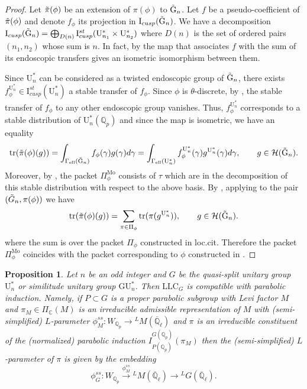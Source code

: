 \documentclass[reqno,11pt]{amsart}
\newtheorem{proposition}[theorem]{Proposition}
\theoremstyle{remark}
\newcommand{\GU}{\mathrm{GU}}
\newcommand{\G}{\mathrm{G}}
\newcommand{\U}{\mathrm{U}}
\newcommand{\C}{\mathbb{C}}
\newcommand{\tr}{\mathrm{tr}}
\newcommand{\Q}{\mathbb{Q}}
\newcommand{\ov}{\overline}
\newcommand{\I}{\mathrm{I}}
\newcommand{\LLC}{\mathrm{LLC}}
\begin{document}
\begin{proof}
Let $ \Tilde{\pi}(\phi) $ be an extension of $\pi(\phi)$ to $ \Tilde{\G}_n $. Let $f$ be a pseudo-coefficient of $\Tilde{\pi}(\phi)$ and denote $ f_{\phi} $ its projection in $ \I_{cusp}(\Tilde{\G}_n) $. We have a decomposition $ \I_{cusp}(\Tilde{\G}_n) = \bigoplus_{D(n)} \I^{st}_{cusp} (\U^*_{n_1} \times \U^*_{n_2} ) $ where $D(n)$ is the set of ordered pairs $(n_1, n_2)$ whose sum is $n$. In fact, by \cite[Proposition 3.5]{Art96} the map that associates $f$ with the sum of its endoscopic transfers gives an isometric isomorphism between them. 

Since $\U^*_n$ can be considered as a twisted endoscopic group of $ \Tilde{\G}_n $, there exists $ f^{\U^*_n}_{\phi} \in \I^{st}_{cusp} (\U^*_n) $ a stable transfer of $f_{\phi}$. Since $\phi$ is $\theta$-discrete, by \cite[Theorem 6.1]{Moe}, the stable transfer of $f_{\phi}$ to any other endoscopic group vanishes. Thus, $f^{\U^*_n}_{\phi}$ corresponds to a stable distribution of $\U^*_n(\Q_p)$ and since the map is isometric, we have an equality
\[
\tr(\Tilde{\pi}(\phi)(g)) = \int_{\Gamma_{\mathrm{ell}}(\Tilde{\G}_n)} f_{\phi} (\gamma) g (\gamma) d\gamma = \int_{\Gamma_{\mathrm{ell}}(\U^*_n)} f^{\U^*_n}_{\phi} (\gamma) g^{\U^*_n} (\gamma) d\gamma, \qquad g \in \mathcal{H}(\Tilde{\G}_n).
\]
Moreover, by \cite[\S 5.5]{Moe}, the packet $ \Pi^{\mathrm{Mo}}_{\phi} $ consists of $\tau$ which are in the decomposition of this stable distribution with respect to the above basis. By \cite[Theorem~3.2.1 (a)]{Mok}, applying to the pair  $(\Tilde{G}_n, \pi(\phi))$ we have
\[
\tr(\Tilde{\pi}(\phi)(g)) = \sum_{\pi \in \Pi_{\phi}} \tr (\pi(g^{\U^*_n})), \qquad g \in \mathcal{H}(\Tilde{\G}_n).
\]
where the sum is over the packet $\Pi_{\phi}$ constructed in loc.cit. Therefore the packet $ \Pi^{\mathrm{Mo}}_{\phi}$ coincides with the packet corresponding to $ \phi $ constructed in \cite{Mok}. 
\end{proof}
  


\begin{proposition}{\label{parindcomp}}
Let $n$ be an odd integer and $G$ be the quasi-split unitary group $\U^*_n$ or similitude unitary group $\GU^*_n$. Then $\LLC_{G}$ is compatible with parabolic induction. Namely, if $P \subset G$ is a proper parabolic subgroup with Levi factor $M$ and $\pi_{M} \in \Pi_{\C}(M)$ is an irreducible admissible representation of $M$ with (semi-simplified) $L$-parameter $\phi_{M}^{ss}: W_{\mathbb{Q}_{p}} \rightarrow \phantom{}^{L}M(\ov{\Q}_{\ell})$ and $\pi$ is an irreducible constituent of the (normalized) parabolic induction $I_{P(\mathbb{Q}_{p})}^{G(\mathbb{Q}_{p})}(\pi_{M})$ then the (semi-simplified) $L$-parameter of $\pi$ is given by the embedding
\[ \phi_G^{ss} : W_{\mathbb{Q}_{p}} \xrightarrow{\phi_M^{ss}} \phantom{}^{L}M(\ov{\Q}_{\ell}) \rightarrow \phantom{}^{L}G(\ov{\Q}_{\ell}). \]
\end{proposition}
\end{document}
